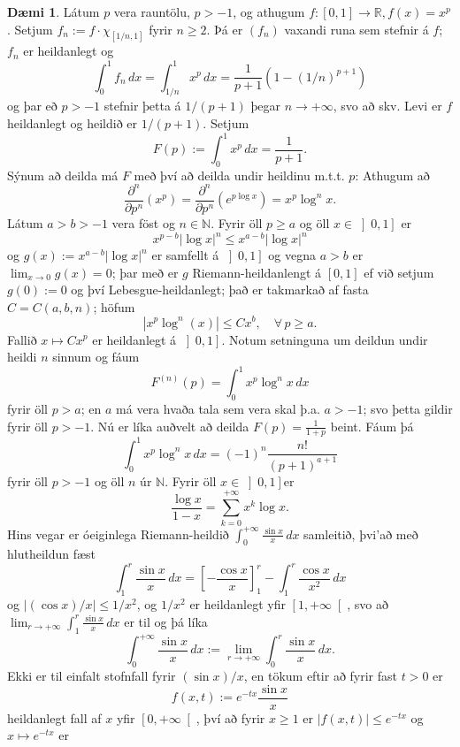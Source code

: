\documentclass[a4paper,icelandic,11pt]{book}
\theoremstyle{plain}      \newtheorem{setn}{Setning}[chapter]
\theoremstyle{definition} \newtheorem{skilgr}[setn]{Skilgreining}
\newtheorem{daemi}[setn]{Dæmi}
\theoremstyle{remark}     \newtheorem*{ath}{Athugasemd}
\newcommand{\R}{\mathbb R}
\newcommand{\N}{\mathbb N}
\begin{document}
\begin{daemi}
  Látum $p$ vera rauntölu, $p>-1$, og athugum
  $f:[0,1]\to\R,f(x)=x^{p}$. Setjum $f_{n}:=f\cdot\chi_{[1/n,1]}$
  fyrir $n\ge 2$. Þá er $(f_{n})$ vaxandi runa sem stefnir á $f$;
  $f_{n}$ er heildanlegt og
  \[
  \int_{0}^{1}f_{n}\,dx
  = \int_{1/n}^{1}x^{p}\,dx
  = \frac{1}{p+1}(1-(1/n)^{p+1})
  \]
  og þar eð $p>-1$ stefnir þetta á $1/(p+1)$ þegar $n\to+\infty$, svo
  að skv. Levi er $f$ heildanlegt og heildið er $1/(p+1)$. Setjum
  \[
  F(p)
  := \int_{0}^{1}x^{p}\,dx
  = \frac 1{p+1}.
  \]
  Sýnum að deilda má $F$ með því að deilda undir heildinu m.t.t. $p$:
  Athugum að
  \[
  \frac{\partial^{n}}{\partial p^{n}}(x^{p})
  = \frac{\partial^{n}}{\partial p^{n}}(e^{p\log x})
  = x^{p}\log^{n}x.
  \]
  Látum $a>b>-1$ vera föst og $n\in\N$. Fyrir öll $p\ge a$ og öll
  $x\in\left]0,1\right]$ er
  \[
  x^{p-b}|\log x|^{n}\le x^{a-b}|\log x|^{n}
  \]
  og $g(x) := x^{a-b}|\log x|^{n}$ er samfellt á  $\left]0,1\right]$
  og vegna $a>b$ er $\lim_{x\to 0}g(x)=0$; þar með er $g$
  Riemann-heildanlengt á $[0,1]$ ef við setjum $g(0):=0$ og því
  Lebesgue-heildanlegt; það er takmarkað af fasta $C=C(a,b,n)$; höfum
  \[
  |x^{p}\log^{n}(x)| \le Cx^{b}, \quad \forall\, p\ge a.
  \]
  Fallið $x\mapsto Cx^{p}$ er heildanlegt á $\left]0,1\right]$. Notum
  setninguna um deildun undir heildi $n$ sinnum og fáum
  \[
  F^{(n)}(p) = \int_{0}^{1}x^{p}\log^{n}x\,dx
  \]
  fyrir öll $p > a$; en $a$ má vera hvaða tala sem vera skal
  þ.a. $a>-1$; svo þetta gildir fyrir öll $p>-1$. Nú er líka auðvelt
  að deilda $F(p)=\frac{1}{1+p}$ beint. Fáum þá
  \[
  \int_{0}^{1}x^{p}\log^{n}x\,dx
  = (-1)^{n}\frac{n!}{(p+1)^{a+1}}
  \]
  fyrir öll $p>-1$ og öll $n$ úr $\N$. Fyrir öll
  $x\in\left]0,1\right]$er
  \[
  \frac{\log x}{1-x}
  = \sum_{k=0}^{+\infty}x^{k}\log x.
  \]
  Hins vegar er óeiginlega Riemann-heildið
  $\int_{0}^{+\infty}\frac{\sin x}x\,dx$ samleitið, þvi'að með
  hlutheildun fæst
  \[
  \int_{1}^{r}\frac{\sin x}x\,dx
  = \left[ -\frac{\cos x}x \right]_{1}^{r}
  - \int_{1}^{r}\frac{\cos x}{x^{2}}\,dx
  \]
  og $|(\cos x)/x|\le 1/x^{2}$, og $1/x^{2}$ er heildanlegt yfir
  $\left[1,+\infty\right[$, svo að
  $\lim_{r\to+\infty}\int_{1}^{r}\frac{\sin x}x\,dx$ er til og þá líka
  \[
  \int_{0}^{+\infty}\frac{\sin x}x\,dx
  := \lim_{r\to+\infty} \int_{0}^{r}\frac{\sin x}x\,dx.
  \]
  Ekki er til einfalt stofnfall fyrir $(\sin x)/x$, en tökum eftir að
  fyrir fast $t>0$ er
  \[
  f(x,t):=e^{-tx}\frac{\sin x}x
  \]
  heildanlegt fall af $x$ yfir $\left[0,+\infty\right[$, því að fyrir
  $x\ge 1$ er $|f(x,t)|\le e^{-tx}$ og $x\mapsto e^{-tx}$ er

\end{daemi}
\end{document}
